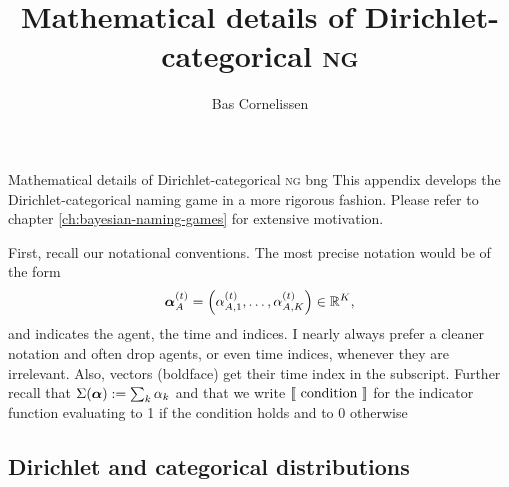 \documentclass{../src/bcthesispart}
\title{Mathematical details of Dirichlet-categorical \textsc{ng}}
\author{Bas Cornelissen}
\begin{document}
%
	{Mathematical details of Dirichlet-categorical \textsc{ng}}%
	{bng}{%
	This appendix develops the Dirichlet-categorical naming game in a more rigorous fashion. Please refer to chapter \ref{ch:bayesian-naming-games} for extensive motivation.
	}

	
	
\noindent
First, recall our notational conventions.
The most precise notation would be of the form
\begin{align}
	\boldsymbol{\mathbf{\alpha}}_A^{(t)} 
		= \Bigl(\alpha_{A,1}^{(t)}, \dots, \alpha_{A, K}^{(t)}\Bigr) 
		\in\mathbb{R}^K,
\end{align}
and indicates the agent, the time and indices. I nearly always prefer a cleaner notation and often drop agents, or even time indices, whenever they are irrelevant.
Also, vectors (boldface) get their time index in the subscript.
Further recall that $\Sigma(\boldsymbol{\mathbf{\alpha}}) := \sum_k \alpha_k$ and that we write $\left\llbracket \text{ condition }\right\rrbracket$ for the indicator function evaluating to 1 if the condition holds and to 0 otherwise




\subsection{Dirichlet and categorical distributions}
\end{document}
